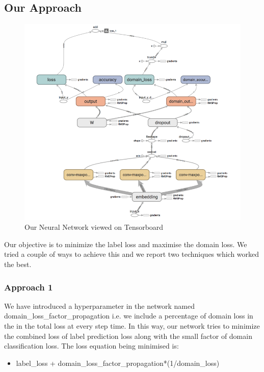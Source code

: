 \documentclass[11pt,a4paper]{article}
\begin{document}
\subsection{Our Approach}
\begin{figure}[htb]
\begin{center}
\includegraphics[width=\columnwidth]{tensorflow_nn.png}
\end{center}
\caption{Our Neural Network viewed on Tensorboard}
\label{fig:figure3}
\end{figure}

Our objective is to minimize the label loss and maximise the domain loss. We tried a couple of ways to achieve this and we report two techniques which worked the best.

\subsubsection{Approach 1}
We have introduced a hyperparameter in the network named domain\_loss\_factor\_propagation i.e. we include a percentage of domain loss in the in the total loss at every step time. In this way, our network tries to minimize the combined loss of label prediction loss along with the small factor of domain classification loss. The loss equation being minimised is:
\begin{itemize}
  \item label\_loss + domain\_loss\_factor\_propagation*(1/domain\_loss)
\end{itemize}
\end{document}

